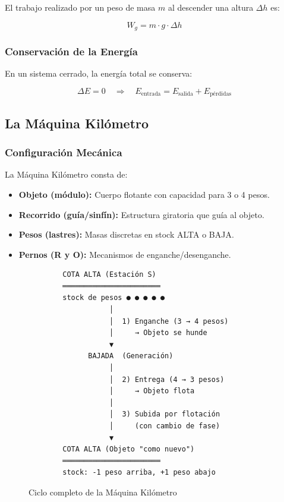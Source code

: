 \documentclass[12pt,a4paper]{article}
\begin{document}
El trabajo realizado por un peso de masa $m$ al descender una altura $\Delta h$ es:

\begin{equation}
W_g = m \cdot g \cdot \Delta h
\end{equation}

\subsubsection{Conservación de la Energía}

En un sistema cerrado, la energía total se conserva:

\begin{equation}
\Delta E = 0 \quad \Rightarrow \quad E_{\text{entrada}} = E_{\text{salida}} + E_{\text{pérdidas}}
\end{equation}

\subsection{La Máquina Kilómetro}

\subsubsection{Configuración Mecánica}

La Máquina Kilómetro consta de:

\begin{itemize}
    \item \textbf{Objeto (módulo):} Cuerpo flotante con capacidad para 3 o 4 pesos.
    \item \textbf{Recorrido (guía/sinfín):} Estructura giratoria que guía al objeto.
    \item \textbf{Pesos (lastres):} Masas discretas en stock ALTA o BAJA.
    \item \textbf{Pernos (R y O):} Mecanismos de enganche/desenganche.
\end{itemize}

\begin{figure}[H]
\centering
\begin{verbatim}
        COTA ALTA (Estación S)
        ═══════════════════════
        stock de pesos ● ● ● ● ●
                   │
                   │  1) Enganche (3 → 4 pesos)
                   │     → Objeto se hunde
                   ▼
              BAJADA  (Generación)
                   │
                   │  2) Entrega (4 → 3 pesos)
                   │     → Objeto flota
                   │
                   │  3) Subida por flotación
                   │     (con cambio de fase)
                   ▼
        COTA ALTA (Objeto "como nuevo")
        ═══════════════════════
        stock: -1 peso arriba, +1 peso abajo
\end{verbatim}
\caption{Ciclo completo de la Máquina Kilómetro}
\label{fig:ciclo}
\end{figure}
\end{document}
